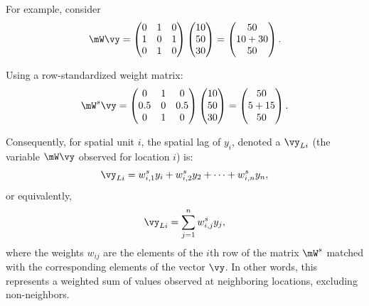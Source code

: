 \documentclass[english,12pt]{book}\usepackage[]{graphicx}\usepackage[]{xcolor}
\begin{document}
For example, consider 
\begin{equation*}
  \mW\vy =    \begin{pmatrix}
     0 & 1 & 0 \\
     1 & 0 & 1 \\
     0 & 1 & 0
  \end{pmatrix}
  \begin{pmatrix}
     10 \\
     50 \\
     30
  \end{pmatrix} =
  \begin{pmatrix}
     50 \\
     10 + 30 \\
     50
  \end{pmatrix}.
\end{equation*}

Using a row-standardized weight matrix:
\begin{equation*}
  \mW^s\vy =    \begin{pmatrix}
     0 & 1 & 0 \\
     0.5 & 0 & 0.5 \\
     0 & 1 & 0
  \end{pmatrix}
  \begin{pmatrix}
     10 \\
     50 \\
     30
  \end{pmatrix} =
  \begin{pmatrix}
     50 \\
     5 + 15 \\
     50
  \end{pmatrix}.
\end{equation*}

Consequently, for spatial unit $i$, the spatial lag of $y_i$, denoted a $\vy_{Li}$ (the variable $\mW\vy$ observed for location $i$) is:
\begin{equation*}
  \vy_{Li} = w_{i, 1}^sy_i + w_{i, 2}^sy_2 + \cdots + w_{i, n}^sy_n, 
\end{equation*}
%
or equivalently,
\begin{equation*}
  \vy_{Li} = \sum_{j = 1}^nw_{i,j}^sy_j,
\end{equation*}
%
where the weights $w_{ij}$ are the elements of the $i$th row of the matrix $\mW^s$ matched with the corresponding elements of the vector $\vy$. In other words, this represents a weighted sum of values observed at neighboring locations, excluding non-neighbors.
\end{document}
